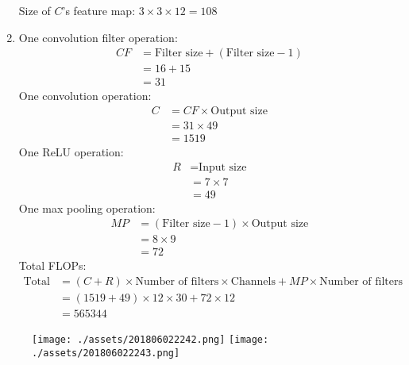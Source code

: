 \documentclass[12pt]{article}
\newenvironment{solution}[2][Solution]{\begin{trivlist}
\item[\hskip \labelsep {\bfseries #1}]}{\end{trivlist}}
\begin{document}
\begin{solution}{}
\begin{enumerate}[label=\alph*)]
Size of $C$'s feature map: $3\times3\times12=108$
\item One convolution filter operation:\\
\begin{align*}
CF &= \text{Filter size}+(\text{Filter size}-1)\\
&= 16+15\\
&= 31
\end{align*}
One convolution operation:\\
\begin{align*}
C &= CF \times \text{Output size}\\
&= 31 \times 49\\
&= 1519
\end{align*}
One ReLU operation:\\
\begin{align*}
R &= \text{Input size}\\
&= 7\times7\\
&= 49
\end{align*}
One max pooling operation:\\
\begin{align*}
MP &= (\text{Filter size}-1)\times\text{Output size}\\
&= 8\times9\\
&= 72 
\end{align*}
Total FLOPs:\\
\begin{align*}
\text{Total} &= (C+R)\times\text{Number of filters}\times\text{Channels}+MP\times\text{Number of filters}\\
&= (1519+49)\times12\times30+72\times12\\
&= 565344
\end{align*}
\end{enumerate}
\end{solution}
\pagebreak
\begin{figure}[h!]
\texttt{[image: ./assets/201806022242.png]}
\texttt{[image: ./assets/201806022243.png]}
\end{figure}
\end{document}
